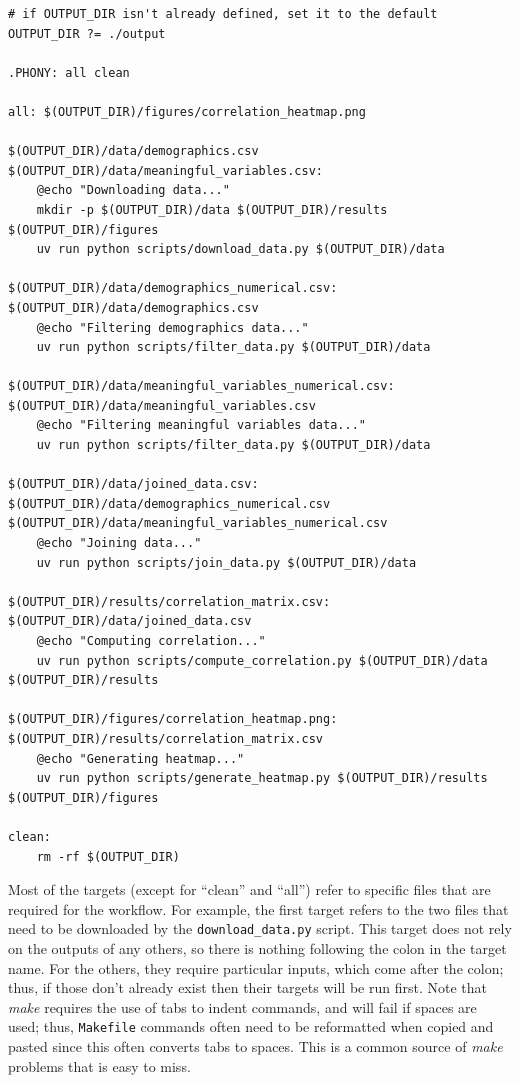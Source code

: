 \begin{lstlisting}[style=makefile]
# if OUTPUT_DIR isn't already defined, set it to the default
OUTPUT_DIR ?= ./output

.PHONY: all clean

all: $(OUTPUT_DIR)/figures/correlation_heatmap.png

$(OUTPUT_DIR)/data/demographics.csv $(OUTPUT_DIR)/data/meaningful_variables.csv:
	@echo "Downloading data..."
	mkdir -p $(OUTPUT_DIR)/data $(OUTPUT_DIR)/results $(OUTPUT_DIR)/figures
	uv run python scripts/download_data.py $(OUTPUT_DIR)/data

$(OUTPUT_DIR)/data/demographics_numerical.csv: $(OUTPUT_DIR)/data/demographics.csv
	@echo "Filtering demographics data..."
	uv run python scripts/filter_data.py $(OUTPUT_DIR)/data

$(OUTPUT_DIR)/data/meaningful_variables_numerical.csv: $(OUTPUT_DIR)/data/meaningful_variables.csv
	@echo "Filtering meaningful variables data..."
	uv run python scripts/filter_data.py $(OUTPUT_DIR)/data

$(OUTPUT_DIR)/data/joined_data.csv: $(OUTPUT_DIR)/data/demographics_numerical.csv $(OUTPUT_DIR)/data/meaningful_variables_numerical.csv
	@echo "Joining data..."
	uv run python scripts/join_data.py $(OUTPUT_DIR)/data

$(OUTPUT_DIR)/results/correlation_matrix.csv: $(OUTPUT_DIR)/data/joined_data.csv
	@echo "Computing correlation..."
	uv run python scripts/compute_correlation.py $(OUTPUT_DIR)/data $(OUTPUT_DIR)/results

$(OUTPUT_DIR)/figures/correlation_heatmap.png: $(OUTPUT_DIR)/results/correlation_matrix.csv
	@echo "Generating heatmap..."
	uv run python scripts/generate_heatmap.py $(OUTPUT_DIR)/results $(OUTPUT_DIR)/figures
	
clean:
	rm -rf $(OUTPUT_DIR)
\end{lstlisting}

Most of the targets (except for ``clean'' and ``all'') refer to specific files that are required for the workflow. For example, the first target refers to the two files that need to be downloaded by the \texttt{download\_data.py} script. This target does not rely on the outputs of any others, so there is nothing following the colon in the target name. For the others, they require particular inputs, which come after the colon; thus, if those don't already exist then their targets will be run first.  Note that \textit{make} requires the use of tabs to indent commands, and will fail if spaces are used; thus, \texttt{Makefile} commands often need to be reformatted when copied and pasted since this often converts tabs to spaces.  This is a common source of \textit{make} problems that is easy to miss.

